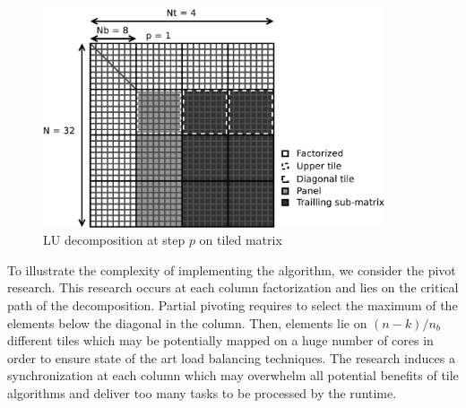 \begin{figure}[!ht]
\centering
\includegraphics[width=0.9\textwidth]{figures/tiled_matrix.pdf}
\caption{LU decomposition at step $p$ on tiled matrix \label{fig:tiled_matrix}}
\end{figure}

To illustrate the complexity of implementing the algorithm, we consider the pivot research. This research occurs at each column factorization and lies on the critical path of the decomposition. Partial pivoting requires to select the maximum of the elements below the diagonal in the column. Then, elements lie on $(n-k)/n_b$ different tiles which may be potentially mapped on a huge number of cores in order to ensure state of the art load balancing techniques. The research induces a synchronization at each column which may overwhelm all potential benefits of tile algorithms and deliver too many tasks to be processed by the runtime.

